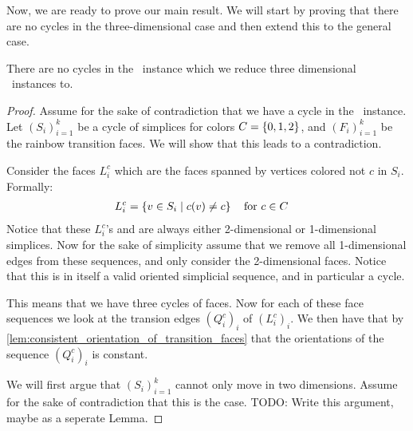 Now, we are ready to prove our main result. We will start by proving that there are no cycles in the three-dimensional case and then extend this to the general case.

\begin{theorem}
	\label{thm:no_cycles_in_three_dimensional_tarskistar}
	There are no cycles in the \EndOfLine\ instance which we reduce three dimensional \Tarskistar\ instances to.
\end{theorem}
\begin{proof}
	Assume for the sake of contradiction that we have a cycle in the \EndOfLine\ instance. Let $\left(S_i\right)_{i=1}^k$ be a cycle of simplices for colors $C = \left\{0, 1, 2\right\}$, and $\left(F_i\right)_{i=1}^k$ be the rainbow transition faces. We will show that this leads to a contradiction. \par

	Consider the faces $L_i^{c}$ which are the faces spanned by vertices colored not $c$ in $S_i$. Formally:
	\begin{align*}
		L_i^c & = \left\{v \in S_i \mid c(v) \neq c\right\} \quad \text{for $c \in C$}
	\end{align*}
	Notice that these $L_i^c$'s and are always either 2-dimensional or 1-dimensional simplices. Now for the sake of simplicity assume that we remove all 1-dimensional edges from these sequences, and only consider the 2-dimensional faces. Notice that this is in itself a valid oriented simplicial sequence, and in particular a cycle.

	This means that we have three cycles of faces. Now for each of these face sequences we look at the transion edges $\left(Q_i^c\right)_i$ of $\left(L_i^c \right)_i$.
	We then have that by \cref{lem:consistent_orientation_of_transition_faces} that the orientations of the sequence $\left(Q_i^c\right)_i$ is constant.

	We will first argue that $\left(S_i\right)_{i=1}^k$ cannot only move in two dimensions. Assume for the sake of contradiction that this is the case. TODO: Write this argument, maybe as a seperate Lemma.


\end{proof}
